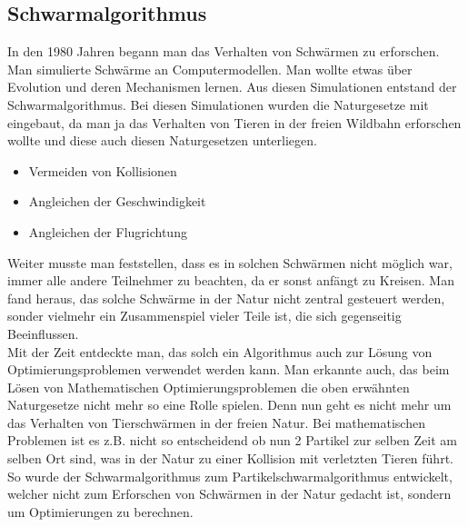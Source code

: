\subsection{Schwarmalgorithmus}

In den 1980 Jahren begann man das Verhalten von Schwärmen zu erforschen. Man simulierte Schwärme an Computermodellen. Man wollte etwas über Evolution und deren Mechanismen lernen. Aus diesen Simulationen entstand der Schwarmalgorithmus.
Bei diesen Simulationen wurden die Naturgesetze mit eingebaut, da man ja das Verhalten von Tieren in der freien Wildbahn erforschen wollte und diese auch diesen Naturgesetzen unterliegen.

\begin{itemize}
\item Vermeiden von Kollisionen 
\item Angleichen der Geschwindigkeit
\item Angleichen der Flugrichtung
\end{itemize}

Weiter musste man feststellen, dass es in solchen Schwärmen nicht möglich war, immer alle andere Teilnehmer zu beachten, da er sonst anfängt zu Kreisen. Man fand heraus, das solche Schwärme in der Natur nicht zentral gesteuert werden, sonder vielmehr ein Zusammenspiel vieler Teile ist, die sich gegenseitig Beeinflussen.\\
Mit der Zeit entdeckte man, das solch ein Algorithmus auch zur Lösung von Optimierungsproblemen verwendet werden kann.
Man erkannte auch, das beim Lösen von Mathematischen Optimierungsproblemen die oben erwähnten Naturgesetze nicht mehr so eine Rolle spielen. Denn nun geht es nicht mehr um das Verhalten von Tierschwärmen in der freien Natur. Bei mathematischen Problemen ist es z.B. nicht so entscheidend ob nun 2 Partikel zur selben Zeit am selben Ort sind, was in der Natur zu einer Kollision mit verletzten Tieren führt. So wurde der Schwarmalgorithmus zum Partikelschwarmalgorithmus entwickelt, welcher nicht zum Erforschen von Schwärmen in der Natur gedacht ist, sondern um Optimierungen zu berechnen.